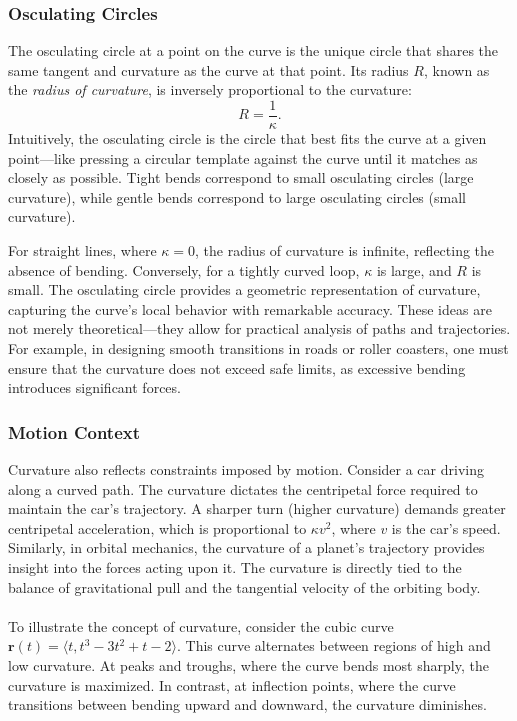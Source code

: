 \subsubsection*{Osculating Circles} 
The osculating circle at a point on the curve is the unique circle that shares the same tangent and curvature as the curve at that point. Its radius \( R \), known as the \textit{radius of curvature}, is inversely proportional to the curvature:
\[
R = \frac{1}{\kappa}.
\]
Intuitively, the osculating circle is the circle that best fits the curve at a given point---like pressing a circular template against the curve until it matches as closely as possible. Tight bends correspond to small osculating circles (large curvature), while gentle bends correspond to large osculating circles (small curvature).

For straight lines, where \( \kappa = 0 \), the radius of curvature is infinite, reflecting the absence of bending. Conversely, for a tightly curved loop, \( \kappa \) is large, and \( R \) is small. The osculating circle provides a geometric representation of curvature, capturing the curve’s local behavior with remarkable accuracy. These ideas are not merely theoretical—they allow for practical analysis of paths and trajectories. For example, in designing smooth transitions in roads or roller coasters, one must ensure that the curvature does not exceed safe limits, as excessive bending introduces significant forces.

\subsubsection*{Motion Context}
Curvature also reflects constraints imposed by motion. Consider a car driving along a curved path. The curvature dictates the centripetal force required to maintain the car’s trajectory. A sharper turn (higher curvature) demands greater centripetal acceleration, which is proportional to \( \kappa v^2 \), where \( v \) is the car's speed. Similarly, in orbital mechanics, the curvature of a planet’s trajectory provides insight into the forces acting upon it. The curvature is directly tied to the balance of gravitational pull and the tangential velocity of the orbiting body. \\ \\ To illustrate the concept of curvature, consider the cubic curve \( \mathbf{r}(t) = \langle t, t^3 - 3t^2 + t - 2 \rangle \). This curve alternates between regions of high and low curvature. At peaks and troughs, where the curve bends most sharply, the curvature is maximized. In contrast, at inflection points, where the curve transitions between bending upward and downward, the curvature diminishes.

